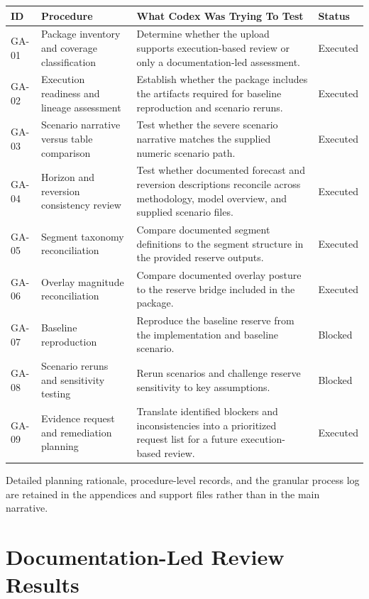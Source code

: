 \documentclass[11pt]{article}
\begin{document}
\begin{center}
\small
\begin{tabularx}{\textwidth}{>{\raggedright\arraybackslash}p{}>{\raggedright\arraybackslash}p{}>{\raggedright\arraybackslash}p{}>{\raggedright\arraybackslash}p{}}
\toprule
ID & Procedure & What Codex Was Trying To Test & Status \\
\midrule
GA-01 & Package inventory and coverage classification & Determine whether the upload supports execution-based review or only a documentation-led assessment. & Executed \\
GA-02 & Execution readiness and lineage assessment & Establish whether the package includes the artifacts required for baseline reproduction and scenario reruns. & Executed \\
GA-03 & Scenario narrative versus table comparison & Test whether the severe scenario narrative matches the supplied numeric scenario path. & Executed \\
GA-04 & Horizon and reversion consistency review & Test whether documented forecast and reversion descriptions reconcile across methodology, model overview, and supplied scenario files. & Executed \\
GA-05 & Segment taxonomy reconciliation & Compare documented segment definitions to the segment structure in the provided reserve outputs. & Executed \\
GA-06 & Overlay magnitude reconciliation & Compare documented overlay posture to the reserve bridge included in the package. & Executed \\
GA-07 & Baseline reproduction & Reproduce the baseline reserve from the implementation and baseline scenario. & Blocked \\
GA-08 & Scenario reruns and sensitivity testing & Rerun scenarios and challenge reserve sensitivity to key assumptions. & Blocked \\
GA-09 & Evidence request and remediation planning & Translate identified blockers and inconsistencies into a prioritized request list for a future execution-based review. & Executed \\
\bottomrule
\end{tabularx}
\normalsize
\end{center}
Detailed planning rationale, procedure-level records, and the granular process log are retained in the appendices and support files rather than in the main narrative.
\section*{Documentation-Led Review Results}
\end{document}
